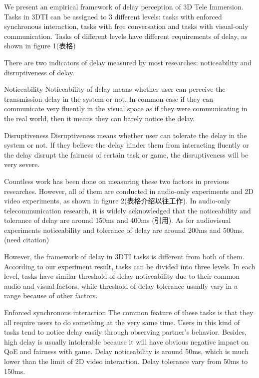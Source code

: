 We present an empirical framework of delay perception of 3D Tele Immersion. Tasks in 3DTI can be assigned to 3 different levels: tasks with enforced synchronous interaction, tasks with free conversation and tasks with visual-only communication. Tasks of different levels have different requirements of delay, as shown in figure 1(表格)

There are two indicators of delay measured by most researches: noticeability and disruptiveness of delay. 

Noticeability Noticeability of delay means whether user can perceive the transmission delay in the system or not. In common case if they can communicate very fluently in the visual space as if they were communicating in the real world, then it means they can barely notice the delay. 

Disruptiveness Disruptiveness means whether user can tolerate the delay in the system or not. If they believe the delay hinder them from interacting fluently or the delay disrupt the fairness of certain task or game, the disruptiveness will be very severe.

Countless work has been done on measuring these two factors in previous researches. However, all of them are conducted in audio-only experiments and 2D video experiments, as shown in figure 2(表格介绍以往工作). In audio-only telecommunication research, it is widely acknowledged that the noticeability and tolerance of delay are around 150ms and 400ms (引用). As for audiovisual experiments noticeability and tolerance of delay are around 200ms and 500ms. (need citation)

However, the framework of delay in 3DTI tasks is different from both of them. According to our experiment result, tasks can be divided into three levels. In each level, tasks have similar threshold of delay noticeability due to their common audio and visual factors, while threshold of delay tolerance usually vary in a range because of other factors.

Enforced synchronous interaction The common feature of these tasks is that they all require users to do something at the very same time. Users in this kind of tasks tend to notice delay easily through observing partner’s behavior. Besides, high delay is usually intolerable because it will have obvious negative impact on QoE and fairness with game. Delay noticeability is around 50ms, which is much lower than the limit of 2D video interaction. Delay tolerance vary from 50ms to 150ms.

